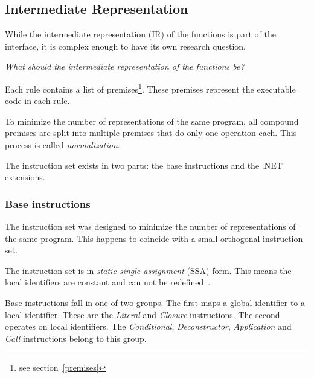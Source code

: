 \subsection{Intermediate Representation}\label{ir}
While the intermediate representation (IR) of the functions is part of the interface, it is complex enough to have its own research question.

\textit{What should the intermediate representation of the functions be?}

Each rule contains a list of premises\footnote{see section~\ref{premises}}.
These premises represent the executable code in each rule.

To minimize the number of representations of the same program, all compound premises are split into multiple premises that do only one operation each.
This process is called \textit{normalization}\label{normalization}.

The instruction set exists in two parts: the base instructions and the .NET extensions.

\subsubsection{Base instructions}
The instruction set was designed to minimize the number of representations of the same program.
This happens to coincide with a small orthogonal instruction set.

The instruction set is in \textit{static single assignment} (SSA) form.
This means the local identifiers are constant and can not be redefined~\cite{leestatic}.

Base instructions fall in one of two groups.
The first maps a global identifier to a local identifier.
These are the \textit{Literal} and \textit{Closure} instructions.
The second operates on local identifiers.
The \textit{Conditional}, \textit{Deconstructor}, \textit{Application} and \textit{Call} instructions belong to this group.

